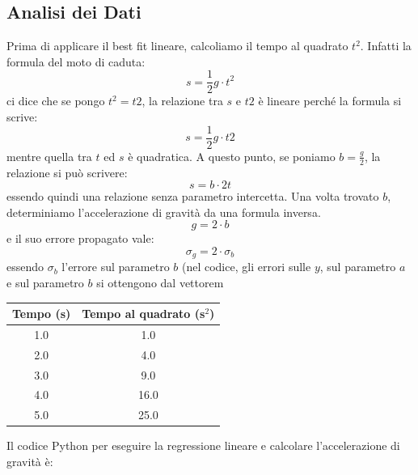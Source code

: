 \documentclass[a4paper,12pt]{article}
\begin{document}
\subsection{Analisi dei Dati}
Prima di applicare il best fit lineare, calcoliamo il tempo al quadrato \( t^2 \). Infatti la formula del moto di caduta:
\[
s=\frac{1}{2}g\cdot t^2
\]
ci dice che se pongo $t^2 =t2$, la relazione tra $s$ e  $t2$ è lineare perché la formula si scrive:
\[
s=\frac{1}{2} g \cdot t2
\]
mentre quella tra $t$ ed $s$ è quadratica. A questo punto, se poniamo  $b=\frac{g}{2}$, la relazione si può scrivere:
\[
s=b\cdot 2t
\]
essendo quindi una relazione senza parametro intercetta. Una volta trovato $b$, determiniamo l'accelerazione di gravità da una formula inversa.
\[
g = 2\cdot b
\]
e il suo errore propagato vale:
\[\sigma_g = 2\cdot \sigma_b
\]
essendo $\sigma_b$ l'errore sul parametro $b$ (nel codice, gli errori sulle $y$, sul parametro $a$ e sul parametro $b$ si ottengono dal vettorem
\begin{center}
\begin{tabular}{|c|c|}
\hline
Tempo (s) & Tempo al quadrato (s\(^2\)) \\
\hline
1.0 & 1.0 \\
2.0 & 4.0 \\
3.0 & 9.0 \\
4.0 & 16.0 \\
5.0 & 25.0 \\
\hline
\end{tabular}
\end{center}

Il codice Python per eseguire la regressione lineare e calcolare l'accelerazione di gravità è:
\end{document}
